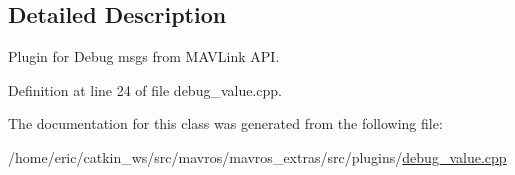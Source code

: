 \subsection{Detailed Description}
Plugin for Debug msgs from M\+A\+V\+Link A\+PI. 

Definition at line 24 of file debug\+\_\+value.\+cpp.



The documentation for this class was generated from the following file\+:\begin{DoxyCompactItemize}
\item 
/home/eric/catkin\+\_\+ws/src/mavros/mavros\+\_\+extras/src/plugins/\mbox{\hyperlink{debug__value_8cpp}{debug\+\_\+value.\+cpp}}\end{DoxyCompactItemize}
